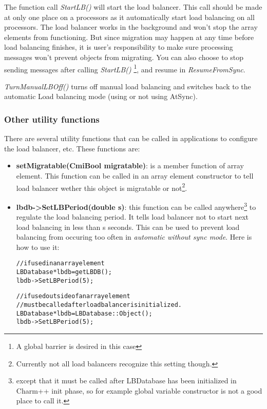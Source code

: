 \begin{enumerate}
The function call {\em StartLB()} will start the load balancer. 
This call should be made at only one place on a processors as it automatically 
start load balancing on all processors. The load balancer works in 
the background and won't stop the array elements from functioning. 
But since migration may happen at any time before load balancing finishes,
it is user's responsibility to make sure processing messages won't 
prevent objects from migrating. You can also choose to stop sending messages 
after calling {\em StartLB()}
\footnote{A global barrier is desired in this case}, and resume 
in {\em ResumeFromSync}.

{\em TurnManualLBOff()} turns off manual load balancing and 
switches back to the automatic Load balancing mode (using or not using AtSync). 

\end{enumerate}

\subsubsection{Other utility functions}

There are several utility functions that can be called in applications to
configure the load balancer, etc. These functions are:

\begin{itemize}
\item {\bf setMigratable(CmiBool migratable)}: is a member function of array
      element. This function can be called 
      in an array element constructor to tell load balancer wether this object
      is migratable or not\footnote{Currently not all load balancers 
      recognize this setting though.}.
\item {\bf lbdb->SetLBPeriod(double s)}: this function can be called
      anywhere\footnote{except that it must be called after LBDatabase
      has been initialized in Charm++ init phase, so for example global 
      variable constructor is not a good place to call it.} to regulate 
      the load balancing period. It tells load balancer not to start next 
      load balancing in less than s seconds. This can be used to prevent 
      load balancing from occuring too often in 
      {\em automatic without sync mode}. Here is how to use it:
      \begin{alltt}
// if used in an array element
LBDatabase *lbdb = getLBDB();
lbdb->SetLBPeriod(5);

// if used outside of an array element
// must be called after load balancer is initialized.
LBDatabase *lbdb = LBDatabase::Object();
lbdb->SetLBPeriod(5);
\end{alltt}
\end{itemize}

